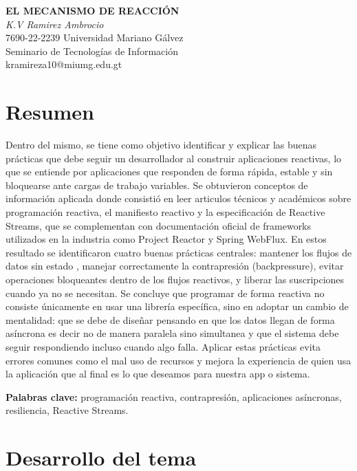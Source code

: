 \documentclass[12pt,letterpaper]{article}
\begin{document}
\begin{center}
{\bfseries EL MECANISMO DE REACCIÓN }
\\[4pt]
\textit{K.V Ramirez Ambrocio}\\
7690-22-2239 \quad Universidad Mariano Gálvez\\
Seminario de Tecnologías de Información\\
kramireza10@miumg.edu.gt
\end{center}

\vspace{6pt}

\section*{Resumen}
Dentro del mismo, se tiene como objetivo identificar y explicar las buenas prácticas que debe seguir un desarrollador al construir aplicaciones reactivas, lo que se entiende por aplicaciones que responden de forma rápida, estable y sin bloquearse ante cargas de trabajo variables. Se  obtuvieron conceptos de información aplicada donde consistió en leer articulos técnicos y académicos sobre programación reactiva, el manifiesto reactivo y la especificación de Reactive Streams, que se complementan con documentación oficial de frameworks utilizados en la industria como Project Reactor y Spring WebFlux. En estos resultado se identificaron cuatro buenas prácticas centrales: mantener los flujos de datos sin estado , manejar correctamente la contrapresión (backpressure), evitar operaciones bloqueantes dentro de los flujos reactivos, y liberar las suscripciones cuando ya no se necesitan. Se concluye que programar de forma reactiva no consiste únicamente en usar una librería específica, sino en adoptar un cambio de mentalidad: que se debe de diseñar pensando en que los datos llegan de forma asíncrona es decir no de manera paralela sino simultanea y que el sistema debe seguir respondiendo incluso cuando algo falla. Aplicar estas prácticas evita errores comunes como el mal uso de recursos  y mejora la experiencia de quien usa la aplicación que al final es lo que deseamos para nuestra app o sistema. 

\textbf{Palabras clave:} programación reactiva, contrapresión, aplicaciones asíncronas, resiliencia, Reactive Streams.

\section*{Desarrollo del tema}
\end{document}
